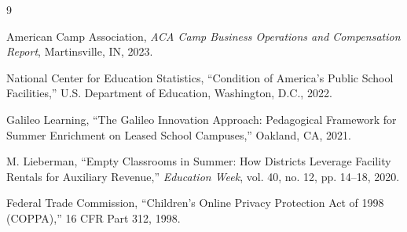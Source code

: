 \documentclass[11pt,a4paper]{article}
\begin{document}
\begin{thebibliography}{9}

American Camp Association, \textit{ACA Camp Business Operations and Compensation Report}, Martinsville, IN, 2023.

National Center for Education Statistics, ``Condition of America's Public School Facilities,'' U.S. Department of Education, Washington, D.C., 2022.

Galileo Learning, ``The Galileo Innovation Approach: Pedagogical Framework for Summer Enrichment on Leased School Campuses,'' Oakland, CA, 2021.

M. Lieberman, ``Empty Classrooms in Summer: How Districts Leverage Facility Rentals for Auxiliary Revenue,'' \textit{Education Week}, vol. 40, no. 12, pp. 14--18, 2020.

Federal Trade Commission, ``Children's Online Privacy Protection Act of 1998 (COPPA),'' 16 CFR Part 312, 1998.

\end{thebibliography}
\end{document}
